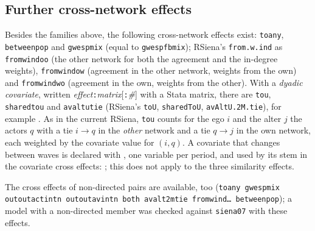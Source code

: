 \subsection{Further cross-network effects}
Besides the families above, the following cross-network effects exist: \texttt{toany}, \texttt{betweenpop} and \texttt{gwespmix} (equal to \texttt{gwespfbmix}); RSiena's \texttt{from.w.ind} as \texttt{fromwindoo} (the other network for both the agreement and the in-degree weights), \texttt{fromwindow} (agreement in the other network, weights from the own) and \texttt{fromwindwo} (agreement in the own, weights from the other). With a \emph{dyadic covariate}, written \emph{effect}\texttt{:}\emph{matrix}[\texttt{:}\emph{\#}] with a Stata matrix, there are \texttt{tou}, \texttt{sharedtou} and \texttt{avaltutie} (RSiena's \texttt{toU}, \texttt{sharedToU}, \texttt{avAltU.2M.tie}), for example . As in the current RSiena, \texttt{tou} counts for the ego $i$ and the alter $j$ the actors $q$ with a tie $i\to q$ in the \emph{other} network and a tie $q\to j$ in the own network, each weighted by the covariate value for $(i,q)$. A covariate that changes between waves is declared with , one variable per period, and used by its stem in the covariate cross effects: ; this does not apply to the three similarity effects.

The cross effects of non-directed pairs are available, too (\texttt{toany gwespmix outoutactintn outoutavintn both avalt2mtie fromwind\ldots{} betweenpop}); a model with a non-directed member was checked against \texttt{siena07} with these effects.

